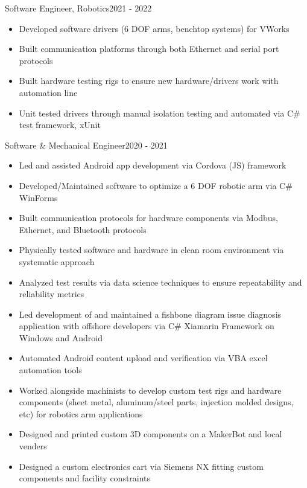 \subtitle{SummerBio}{Software Engineer, Robotics}{2021 - 2022}

\begin{itemize}
    \item Developed software drivers (6 DOF arms, benchtop systems) for VWorks
    \item Built communication platforms through both Ethernet and serial port protocols
    \item Built hardware testing rigs to ensure new hardware/drivers work with automation line
    \item Unit tested drivers through manual isolation testing and automated via C\# test framework, xUnit
\end{itemize}



\subtitle{Lam Research}{Software \& Mechanical Engineer}{2020 - 2021}

\begin{itemize}
    \item Led and assisted Android app development via Cordova (JS) framework
    \item Developed/Maintained software to optimize a 6 DOF robotic arm via C\# WinForms
    \item Built communication protocols for hardware components via Modbus, Ethernet, and Bluetooth protocols
    \item Physically tested software and hardware in clean room environment via systematic approach
    \item Analyzed test results via data science techniques to ensure repeatability and reliability metrics
    \item Led development of and maintained a fishbone diagram issue diagnosis application with offshore developers via C\# Xiamarin Framework on Windows and Android
    \item Automated Android content upload and verification via VBA excel automation tools
    \item Worked alongside machinists to develop custom test rigs and hardware components (sheet metal, aluminum/steel parts, injection molded designs, etc) for robotics arm applications
    \item Designed and printed custom 3D components on a MakerBot and local venders
    \item Designed a custom electronics cart via Siemens NX fitting custom components and facility constraints
\end{itemize}


